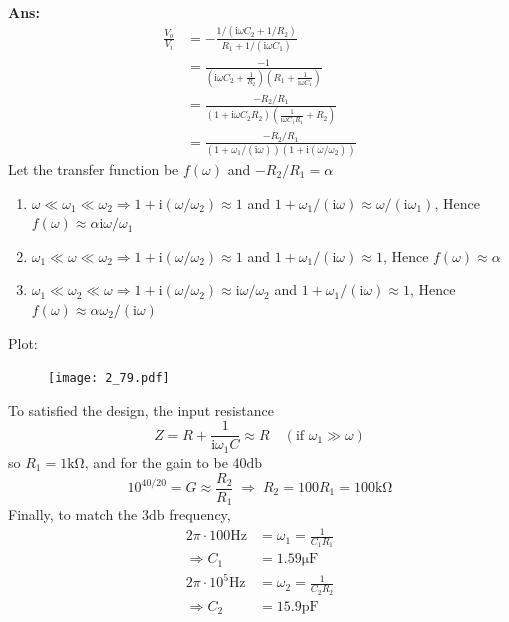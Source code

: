 \documentclass[12pt, a4paper]{article}
\newcommand{\skom}{\si{\kilo\ohm}}
\newcommand{\sdb}{\si{\decibel}}
\newcommand{\shz}{\si{\hertz}}
\newcommand{\img}{\mathrm{i}}
\newcommand{\Ans}{{\\ \bf Ans:} \\}
\begin{document}
\Ans
\begin{align*}
  \frac{V_o}{V_i} &= -\frac{1 / (\img \omega C_2 + 1 / R_2)}{R_1 + 1 / (\img \omega C_1)}\\
  &= \frac{-1}{\left( \img \omega C_2 + \frac{1}{R_2} \right) \left( R_1 + \frac{1}{\img \omega C_1} \right)}\\
  &= \frac{-R_2/R_1}{(1 + \img \omega C_2 R_2) \left( \frac{1}{\img \omega C_1 R_1} + R_2 \right)}\\
  &= \frac{-R_2/R_1}{(1+\omega_1/(\img \omega))(1+\img(\omega/\omega_2))}
\end{align*}
Let the transfer function be $f(\omega)$ and $- R_2 / R_1 = \alpha$
\begin{enumerate}[label=(\alph*)]
  \item $\omega \ll \omega_1 \ll \omega_2 \Rightarrow 1 + \img(\omega / \omega_2) \approx 1$ and $1 + \omega_1/(\img \omega) \approx \omega / (\img \omega_1)$, Hence $f(\omega) \approx \alpha \img \omega / \omega_1$
  \item $\omega_1 \ll \omega \ll \omega_2 \Rightarrow 1 + \img(\omega / \omega_2) \approx 1$ and $1 + \omega_1/(\img \omega) \approx 1$, Hence $f(\omega) \approx \alpha$
  \item $\omega_1 \ll \omega_2 \ll \omega \Rightarrow 1 + \img(\omega / \omega_2) \approx \img \omega / \omega_2$ and $1 + \omega_1/(\img \omega) \approx 1$, Hence $f(\omega) \approx \alpha \omega_2 / (\img \omega)$
\end{enumerate}
Plot: 
\begin{figure}[H]
  \centering
  \texttt{[image: 2\_79.pdf]}
\end{figure}
To satisfied the design, the input resistance
\[
  Z = R + \frac{1}{\img \omega_1 C} \approx R \quad (\text{if } \omega_1 \gg \omega)
\]
so $R_1 = 1\skom$, and for the gain to be $40 \sdb$
\[
  10^{40/20} = G \approx \frac{R_2}{R_1} \; \Rightarrow \; R_2 = 100 R_1 = 100 \skom
\]
Finally, to match the $3 \sdb$ frequency, 
\begin{align*}
  2 \pi \cdot 100 \shz &= \omega_1 = \frac{1}{C_1R_1}\\
  \Rightarrow C_1 &= 1.59 \si{\micro\farad}\\
  2 \pi \cdot 10^{5} \shz &= \omega_2 = \frac{1}{C_2R_2} \\
  \Rightarrow C_2 &= 15.9 \si{\pico\farad} 
\end{align*}
\end{document}
